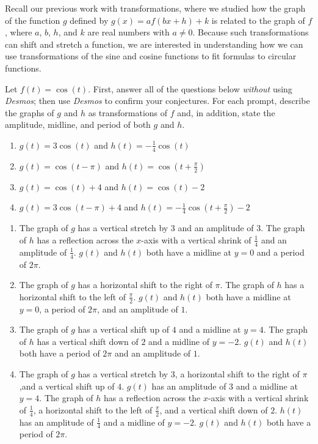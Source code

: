 \documentclass{ximera}
\begin{document}
Recall our previous work with transformations, where we studied how the graph of the function \(g\) defined by \(g(x) = af(bx + h) + k\) is related to the graph of \(f\), where \(a\), \(b\), $h$, and \(k\) are real numbers with \(a \ne 0\).  Because such transformations can shift and stretch a function, we are interested in understanding how we can use transformations of the sine and cosine functions to fit formulas to circular functions.%
\begin{example}
Let \(f(t) = \cos(t)\).  First, answer all of the questions below \emph{without} using \emph{Desmos}; then use \emph{Desmos} to confirm your conjectures.  For each prompt, describe the graphs of \(g\) and \(h\) as transformations of \(f\) and, in addition, state the amplitude, midline, and period of both \(g\) and \(h\).%
\begin{enumerate}[label=\alph*.]
\item \(g(t) = 3\cos(t)\) and \(h(t) = -\frac{1}{4}\cos(t)\)%
\item \(g(t) = \cos(t-\pi)\) and \(h(t) = \cos\left(t+ \frac{\pi}{2}\right)\)%
\item \(g(t) = \cos(t)+4\) and \(h(t) = \cos\left(t\right)-2\)%
\item \(g(t) = 3\cos(t-\pi)+4\) and \(h(t) = -\frac{1}{4}\cos\left(t+ \frac{\pi}{2}\right)-2\)%
\end{enumerate}
\begin{explanation}
\begin{enumerate}[label=\alph*.]
\item The graph of $g$ has a vertical stretch by 3 and an amplitude of 3. The graph of $h$ has a reflection across the $x$-axis with a vertical shrink of $\frac{1}{4}$ and an amplitude of $\frac{1}{4}$. $g(t)$ and $h(t)$ both have a midline at $y=0$ and a period of $2\pi$.
\item The graph of $g$ has a horizontal shift to the right of $\pi$. The graph of $h$ has a horizontal shift to the left of $\frac{\pi}{2}$. $g(t)$ and $h(t)$ both have a midline at $y=0$, a period of $2\pi$, and an amplitude of $1$.
\item The graph of $g$ has a vertical shift up of $4$ and a midline at $y=4$. The graph of $h$ has a vertical shift down of $2$ and a midline of $y=-2$. $g(t)$ and $h(t)$ both have a period of $2\pi$ and an amplitude of $1$.
\item The graph of $g$ has a vertical stretch by 3,  a horizontal shift to the right of $\pi$,and a vertical shift up of $4$. $g(t)$ has an amplitude of 3 and a midline at $y=4$. The graph of $h$ has a reflection across the $x$-axis with a vertical shrink of $\frac{1}{4}$, a horizontal shift to the left of $\frac{\pi}{2}$, and a vertical shift down of $2$. $h(t)$has an amplitude of $\frac{1}{4}$ and a midline of $y=-2$. $g(t)$ and $h(t)$ both have a period of $2\pi$.
\end{enumerate}
\end{explanation}
%
\end{example}
\end{document}
